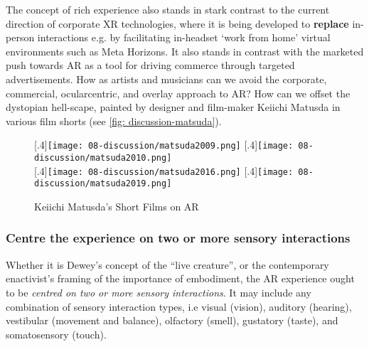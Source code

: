 The concept of rich experience also stands in stark contrast to the current direction of corporate XR technologies, where it is being developed to \textbf{replace} in-person interactions e.g. by facilitating in-headset `work from home' virtual environments such as Meta Horizons. It also stands in contrast with the marketed push towards AR as a tool for driving commerce through targeted advertisements. How as artists and musicians can we avoid the corporate, commercial, ocularcentric, and overlay approach to AR? How can we offset the dystopian hell-scape, painted by designer and film-maker Keiichi Matusda in various film shorts (see \autoref{fig: discussion-matsuda}).

\begin{figure}
    \centering
    [.4\linewidth]{\texttt{[image: 08-discussion/matsuda2009.png]}}
    [.4\linewidth]{\texttt{[image: 08-discussion/matsuda2010.png]}} \\
    \vspace{0.5cm}
    [.4\linewidth]{\texttt{[image: 08-discussion/matsuda2016.png]}}
    [.4\linewidth]{\texttt{[image: 08-discussion/matsuda2019.png]}}
    \caption{Keiichi Matusda's Short Films on AR}
    \label{fig: discussion-matsuda}
\end{figure}

\subsubsection{Centre the experience on two or more sensory interactions}
Whether it is Dewey's concept of the ``live creature'', or the contemporary enactivist's framing of the importance of embodiment, the AR experience ought to be \textit{centred on two or more sensory interactions}. It may include any combination of sensory interaction types, i.e visual (vision), auditory (hearing), vestibular (movement and balance), olfactory (smell), gustatory (taste), and somatosensory (touch). %

